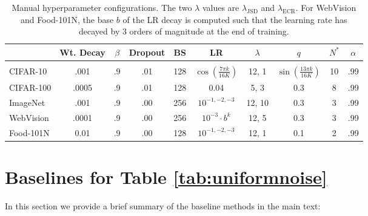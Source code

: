\documentclass{article}
\DeclareMathOperator{\ECR}{ECR}
\DeclareMathOperator{\JSD}{JSD}
\begin{document}
\begin{table*}
    \renewcommand{\arraystretch}{1.5}
    \centering
    \caption{Manual hyperparameter configurations. The two $\lambda$ values are $\lambda_{\JSD}$ and $\lambda_{\ECR}$. For WebVision and Food-101N, the base $b$ of the LR decay is computed such that the learning rate has decayed by 3 orders of magnitude at the end of training.}\begin{tabular}{lccccccccc}
    \\
    \toprule
              & Wt. Decay & $\beta$ & Dropout & BS  & LR                                & $\lambda$ & $q$                           & $N^*$ & $\alpha$ \\
    \hline\\[-2ex]
    CIFAR-10  & .001      & .9      & .01     & 128 & $\cos( \frac{7 \pi k}{16 K})$     & 12, 1     & $\sin( \frac{13\pi k}{16 K})$ & 10    & .99 \\
    CIFAR-100 & .0005     & .9      & .01     & 128 & 0.04                              & 5, 3      & 0.3                           & 8     & .99 \\
    ImageNet  & .001      & .9      & .00     & 256 & $10^{-1, -2, -3}$                 & 12, 10    & 0.3                           & 3     & .99 \\
    WebVision & .0001     & .9      & .00     & 256 & $10^{-3} \cdot b^k$                              & 12, 5     & 0.3                           & 3     & .99 \\
    Food-101N & 0.01      & .9      & .00     & 128 & $10^{-1, -2, -3}$                 & 12, 1     & 0.1                           & 2     & .99 \\
    \bottomrule
    \end{tabular}
    \label{tab:manual_config}
\end{table*}



\section{Baselines for Table \ref{tab:uniformnoise}}
\label{appendix:baselines}
In this section we provide a brief summary of the baseline methods in the main text:
\end{document}
